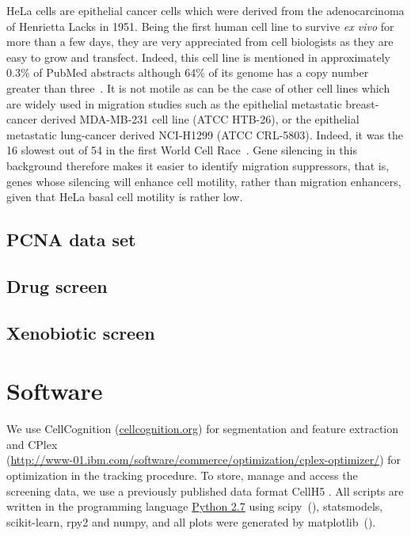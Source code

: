HeLa cells are epithelial cancer cells which were derived from the adenocarcinoma of Henrietta Lacks in 1951. Being the first human cell line to survive \textit{ex vivo} for more than a few days, they are very appreciated from cell biologists as they are easy to grow and transfect. Indeed, this cell line is mentioned in approximately 0.3\% of PubMed abstracts although 64\% of its genome has a copy number greater than three~\cite{pmid23925245}. It is not motile as can be the case of other cell lines which are widely used in migration studies such as the epithelial metastatic breast-cancer derived MDA-MB-231 cell line (ATCC\up{\textregistered} HTB-26\texttrademark), or the epithelial metastatic lung-cancer derived NCI-H1299 (ATCC\up{\textregistered} CRL-5803\texttrademark). Indeed, it was the 16 slowest out of 54 in the first World Cell Race~\cite{pmid22974990}. Gene silencing in this background therefore makes it easier to identify migration suppressors, that is, genes whose silencing will enhance cell motility, rather than migration enhancers, given that HeLa basal cell motility is rather low.

\subsection{PCNA data set}
\subsection{Drug screen}
\subsection{Xenobiotic screen}
\section{Software}

We use CellCognition
\cite{cellcognition} (\href{http://cellcognition.org}{cellcognition.org}) for segmentation and feature
extraction and CPlex \\ (\href{http://www-01.ibm.com/software/commerce/optimization/cplex-optimizer/}{http://www-01.ibm.com/software/commerce/optimization/cplex-optimizer/}) for optimization in the tracking procedure. To store, manage and access the
screening data, we use a previously published data format CellH5
\cite{Sommer2013}. All scripts are written in the programming language \href{http://www.python.org}{Python 2.7}
using scipy~(\cite{scipy}), statsmodels, scikit-learn, rpy2 and numpy, and all plots were generated by matplotlib~(\cite{matplotlib}).